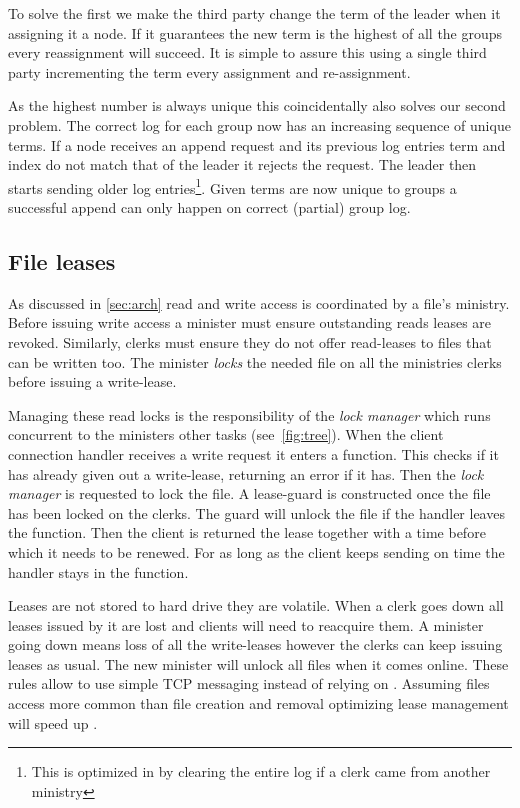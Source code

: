 To solve the first we make the third party change the term of the leader when it assigning it a node. If it guarantees the new term is the highest of all the groups every reassignment will succeed. It is simple to assure this using a single third party incrementing the term every assignment and re-assignment. 

As the highest number is always unique this coincidentally also solves our second problem. The correct log for each group now has an increasing sequence of unique terms. If a node receives an append request and its previous log entries term and index do not match that of the leader it rejects the request. The leader then starts sending older log entries\footnote{This is optimized in \name{} by clearing the entire log if a clerk came from another ministry}. Given terms are now unique to groups a successful append can only happen on correct (partial) group log.

\subsection{File leases}
As discussed in \cref{sec:arch} read and write access is coordinated by a file's ministry. Before issuing write access a minister must ensure outstanding reads leases are revoked. Similarly, clerks must ensure they do not offer read-leases to files that can be written too. The minister \emph{locks} the needed file on all the ministries clerks before issuing a write-lease. 

Managing these read locks is the responsibility of the \textit{lock manager} which runs concurrent to the ministers other tasks (see~\cref{fig:tree}). When the client connection handler \straightTasksLeg{} receives a write request it enters a  function. This checks if it has already given out a write-lease, returning an error if it has. Then the \textit{lock manager} is requested to lock the file. A lease-guard is constructed once the file has been locked on the clerks. The guard will unlock the file if the handler leaves the  function. Then the client is returned the lease together with a time before which it needs to be renewed. For as long as the client keeps sending  on time the handler stays in the  function.

Leases are not stored to hard drive they are volatile. When a clerk goes down all leases issued by it are lost and clients will need to reacquire them. A minister going down means loss of all the write-leases however the clerks can keep issuing leases as usual. The new minister will unlock all files when it comes online. These rules allow \name{} to use simple TCP messaging instead of relying on \raft{}. Assuming files access more common than file creation and removal optimizing lease management will speed up \name{}.

